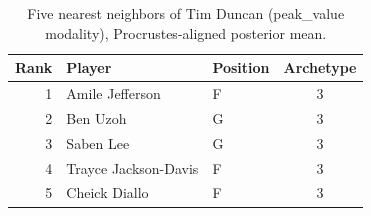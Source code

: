 \begin{table}[htbp]
  \centering\small
  \begin{tabular}{rllc}
    \toprule
    Rank & Player & Position & Archetype \\
    \midrule
    1 & Amile Jefferson & F & 3 \\
    2 & Ben Uzoh & G & 3 \\
    3 & Saben Lee & G & 3 \\
    4 & Trayce Jackson-Davis & F & 3 \\
    5 & Cheick Diallo & F & 3 \\
    \bottomrule
  \end{tabular}
  \caption{Five nearest neighbors of Tim Duncan (peak_value modality), Procrustes-aligned posterior mean.}
  \label{tab:Tim_Duncan_neighbors_peak_value}
\end{table}

